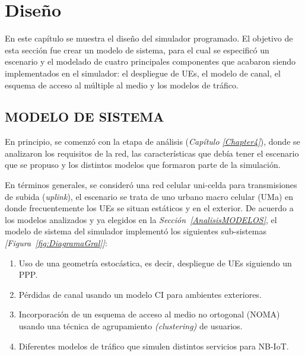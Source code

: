 
\chapter{Diseño} %

\label{Chapter5} %

En este capítulo se muestra el diseño del simulador programado. El objetivo  de esta sección fue crear un modelo de sistema, para el cual se especificó un escenario y el modelado de cuatro principales componentes que acabaron siendo implementados en el simulador: el despliegue de UEs, el modelo de canal, el esquema de acceso al múltiple al medio y los modelos de tráfico.\newline


\section{MODELO DE SISTEMA}

En principio, se comenzó con la etapa de análisis (\textit{Capítulo \ref{Chapter4}}), donde se analizaron los requisitos de la red, las características que debía tener el escenario que se propuso y los distintos modelos que formaron parte de la simulación.\newline

En términos generales, se consideró una red celular uni-celda para transmisiones de subida (\textit{uplink}), el escenario se trata de uno urbano macro celular (UMa) en donde frecuentemente los UEs se situan estáticos y en el exterior. De acuerdo a los modelos analizados y ya elegidos en la \textit{Sección~\ref{AnalisisMODELOS}}, el modelo de sistema del simulador  implementó los siguientes sub-sistemas \textit{[Figura~\ref{fig:DiagramaGral}]}:

\begin{enumerate}
    \item  Uso de una geometría estocástica, es decir, despliegue de UEs siguiendo un PPP.
    \item  Pérdidas de canal usando un modelo CI para ambientes exteriores.
    \item  Incorporación de un esquema de acceso al medio no ortogonal (NOMA) usando una técnica de agrupamiento \textit{(clustering)} de usuarios.
    \item  Diferentes modelos de tráfico que simulen distintos servicios para NB-IoT.
\end{enumerate}

